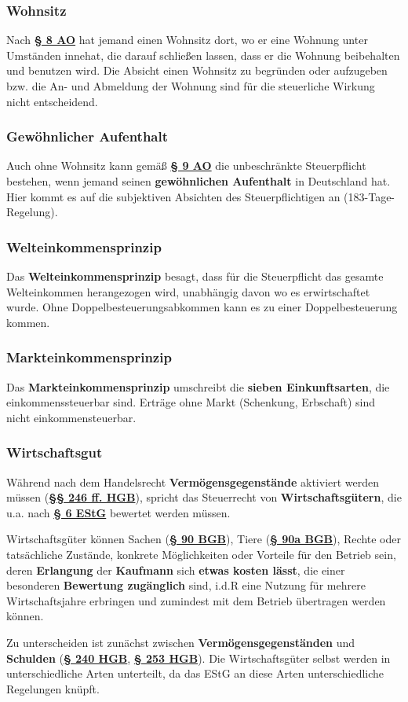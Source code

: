 \documentclass[12pt,A4]{extarticle}
\newcommand{\highlight}[1]{\textcolor{highlightColor}{\textbf{#1}}}
\newcommand{\estG}[2][]{\textbf{\textcolor{gesetzLink}{\href{https://www.gesetze-im-internet.de/estg/__#2.html}{§ #2 \ifthenelse{\equal{#1}{}}{}{#1 }EStG}}}}
\newcommand{\abgabenordnung}[2][]{\textbf{\textcolor{gesetzLink}{\href{https://www.gesetze-im-internet.de/ao_1977/__#2.html}{§ #2 \ifthenelse{\equal{#1}{}}{}{#1 }AO}}}}
\newcommand{\bgb}[2][]{\textbf{\textcolor{gesetzLink}{\href{https://www.gesetze-im-internet.de/bgb/__#2.html}{§ #2 \ifthenelse{\equal{#1}{}}{}{#1 }BGB}}}}
\newcommand{\hgb}[2][]{\textbf{\textcolor{gesetzLink}{\href{https://www.gesetze-im-internet.de/hgb/__#2.html}{§ #2 \ifthenelse{\equal{#1}{}}{}{#1 }HGB}}}}
\newcommand{\hgbb}[2][]{\textbf{\textcolor{gesetzLink}{\href{https://www.gesetze-im-internet.de/hgb/__#2.html}{§§ #1 HGB}}}}
\begin{document}
\subsubsection{Wohnsitz}
Nach \abgabenordnung{8} hat jemand einen Wohnsitz dort, wo er eine Wohnung unter Umständen innehat, die darauf schließen lassen, dass er die Wohnung beibehalten und benutzen wird. Die Absicht einen Wohnsitz zu begründen oder aufzugeben bzw. die An- und Abmeldung der Wohnung sind für die steuerliche Wirkung nicht entscheidend.

\subsubsection{Gewöhnlicher Aufenthalt}
Auch ohne Wohnsitz kann gemäß \abgabenordnung{9} die unbeschränkte Steuerpflicht bestehen, wenn jemand seinen \textbf{gewöhnlichen Aufenthalt} in Deutschland hat. Hier kommt es auf die subjektiven Absichten des Steuerpflichtigen an (183-Tage-Regelung).

\subsubsection{Welteinkommensprinzip}
Das \highlight{Welteinkommensprinzip} besagt, dass für die Steuerpflicht das gesamte Welteinkommen herangezogen wird, unabhängig davon wo es erwirtschaftet wurde. Ohne Doppelbesteuerungsabkommen kann es zu einer Doppelbesteuerung kommen.

\subsubsection{Markteinkommensprinzip}
Das \textbf{Markteinkommensprinzip} umschreibt die \textbf{sieben Einkunftsarten}, die einkommenssteuerbar sind. Erträge ohne Markt (Schenkung, Erbschaft) sind nicht einkommensteuerbar.

\subsubsection{Wirtschaftsgut}
Während nach dem Handelsrecht \textbf{Vermögensgegenstände} aktiviert werden müssen (\hgbb[246 ff.]{246}), spricht das Steuerrecht von \highlight{Wirtschaftsgütern}, die u.a. nach \estG{6} bewertet werden müssen.\par
Wirtschaftsgüter können Sachen (\bgb{90}), Tiere (\bgb{90a}), Rechte oder tatsächliche Zustände, konkrete Möglichkeiten oder Vorteile für den Betrieb sein, deren \textbf{Erlangung} der \textbf{Kaufmann} sich \textbf{etwas kosten lässt}, die einer besonderen \textbf{Bewertung zugänglich} sind, i.d.R eine Nutzung für mehrere Wirtschaftsjahre erbringen und zumindest mit dem Betrieb übertragen werden können.\par
Zu unterscheiden ist zunächst zwischen \textbf{Vermögensgegenständen} und \textbf{Schulden} (\hgb[Abs. 1]{240}, \hgb{253}). Die Wirtschaftsgüter selbst werden in unterschiedliche Arten unterteilt, da das EStG an diese Arten unterschiedliche Regelungen knüpft.
\end{document}
